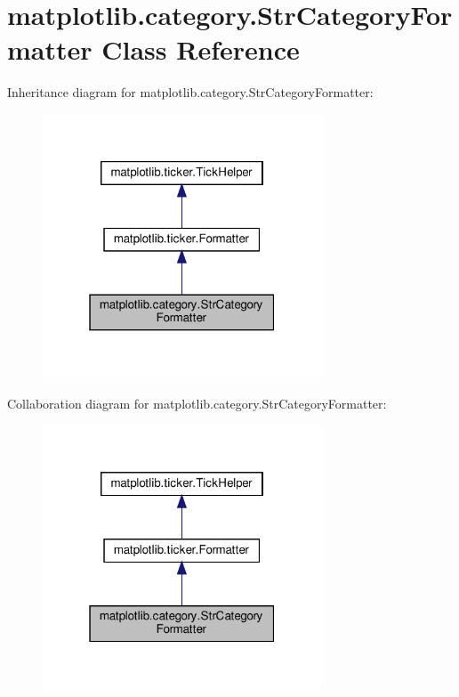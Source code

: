 \hypertarget{classmatplotlib_1_1category_1_1StrCategoryFormatter}{}\section{matplotlib.\+category.\+Str\+Category\+Formatter Class Reference}
\label{classmatplotlib_1_1category_1_1StrCategoryFormatter}


Inheritance diagram for matplotlib.\+category.\+Str\+Category\+Formatter\+:
\nopagebreak
\begin{figure}[H]
\begin{center}
\leavevmode
\includegraphics[width=235pt]{classmatplotlib_1_1category_1_1StrCategoryFormatter__inherit__graph}
\end{center}
\end{figure}


Collaboration diagram for matplotlib.\+category.\+Str\+Category\+Formatter\+:
\nopagebreak
\begin{figure}[H]
\begin{center}
\leavevmode
\includegraphics[width=235pt]{classmatplotlib_1_1category_1_1StrCategoryFormatter__coll__graph}
\end{center}
\end{figure}
